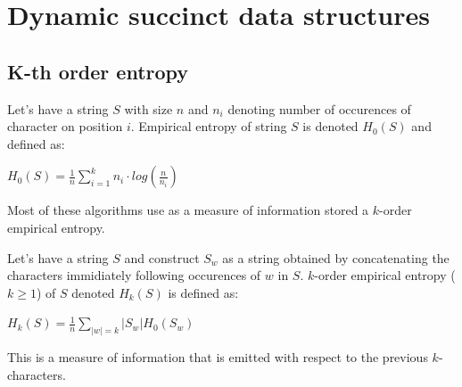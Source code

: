 \section{Dynamic succinct data structures}

\subsection{K-th order entropy}

\begin{theorem}
Let's have a string $S$ with size $n$ and $n_i$ denoting number of occurences of character
on position $i$. Empirical entropy of string $S$ is denoted $H_0(S)$ and defined as:
\begin{center}
$H_0(S) = \frac{1}{n} \sum_{i=1}^{k} n_i\cdot log(\frac{n}{n_i})$
\end{center}
\end{theorem}

Most of these algorithms use as a measure of information stored a $k$-order empirical entropy.

\begin{theorem}
Let's have a string $S$ and construct $S_w$ as a string obtained by concatenating the characters immidiately following occurences of $w$ in $S$.
$k$-order empirical entropy ($k \geq 1$) of $S$ denoted $H_k(S)$ is defined as:
\begin{center}
$H_k(S) = \frac{1}{n} \sum_{|w|=k} |S_w| H_0(S_w)$
\end{center}
\end{theorem}

This is a measure of information that is emitted with respect to the previous $k$-characters.
